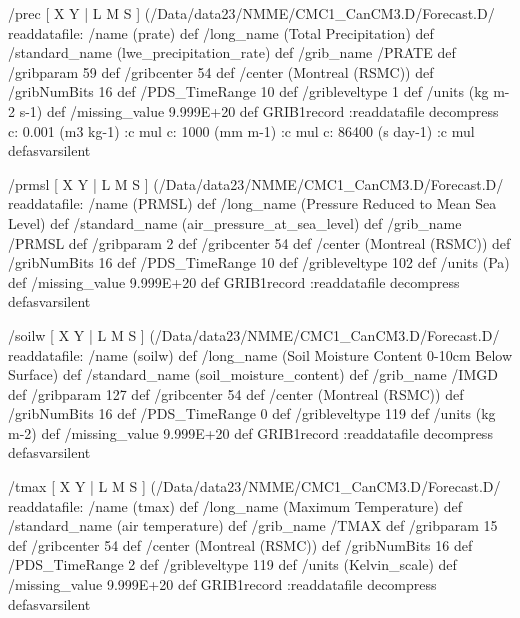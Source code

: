 \begin{ingrid}
/prec {
[ X Y | L M S ] (/Data/data23/NMME/CMC1_CanCM3.D/Forecast.D/%
readdatafile: 
/name (prate) def
/long_name (Total Precipitation) def
/standard_name (lwe_precipitation_rate) def
/grib_name /PRATE def
/gribparam 59 def
/gribcenter 54 def
/center (Montreal (RSMC)) def
/gribNumBits 16 def
/PDS_TimeRange 10 def
/gribleveltype 1 def
/units (kg m-2 s-1) def
/missing_value 9.999E+20 def
GRIB1record
:readdatafile decompress
  c:
   0.001 (m3 kg-1) :c
   mul
  c:
   1000 (mm m-1) :c
   mul
  c:
   86400 (s day-1) :c
   mul
} defasvarsilent

/prmsl {
[ X Y | L M S ] (/Data/data23/NMME/CMC1_CanCM3.D/Forecast.D/%
readdatafile: 
/name (PRMSL) def
/long_name (Pressure Reduced to Mean Sea Level) def
/standard_name (air_pressure_at_sea_level) def
/grib_name /PRMSL def
/gribparam 2 def
/gribcenter 54 def
/center (Montreal (RSMC)) def
/gribNumBits 16 def
/PDS_TimeRange 10 def
/gribleveltype 102 def
/units (Pa) def
/missing_value 9.999E+20 def
GRIB1record
:readdatafile decompress
} defasvarsilent

/soilw {
[ X Y | L M S ] (/Data/data23/NMME/CMC1_CanCM3.D/Forecast.D/%
readdatafile: 
/name (soilw) def
/long_name (Soil Moisture Content 0-10cm Below Surface) def
/standard_name (soil_moisture_content) def
/grib_name /IMGD def
/gribparam 127 def
/gribcenter 54 def
/center (Montreal (RSMC)) def
/gribNumBits 16 def
/PDS_TimeRange 0 def
/gribleveltype 119 def
/units (kg m-2) def
/missing_value 9.999E+20 def
GRIB1record
:readdatafile decompress
} defasvarsilent

/tmax {
[ X Y | L M S ] (/Data/data23/NMME/CMC1_CanCM3.D/Forecast.D/%
readdatafile: 
/name (tmax) def
/long_name (Maximum Temperature) def
/standard_name (air temperature) def
/grib_name /TMAX def
/gribparam 15 def
/gribcenter 54 def
/center (Montreal (RSMC)) def
/gribNumBits 16 def
/PDS_TimeRange 2 def
/gribleveltype 119 def
/units (Kelvin_scale) def
/missing_value 9.999E+20 def
GRIB1record
:readdatafile decompress
} defasvarsilent


\end{ingrid}
